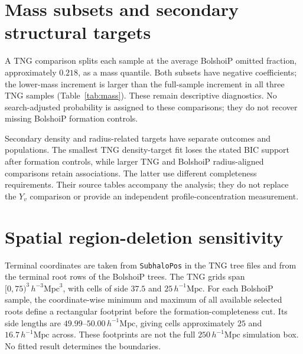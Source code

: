 \documentclass[11pt,a4paper]{article}
\begin{document}
\section{Mass subsets and secondary structural targets}\label{sup:secondary}
A TNG comparison splits each sample at the average BolshoiP omitted fraction, approximately $0.218$, as a mass quantile. Both subsets have negative coefficients; the lower-mass increment is larger than the full-sample increment in all three TNG samples (Table~\ref{tab:mass}). These remain descriptive diagnostics. No search-adjusted probability is assigned to these comparisons; they do not recover missing BolshoiP formation controls.
\begin{table}[htbp]\centering\small

\caption{TNG mass-subset fits with the four epochs. Errors are conventional OLS estimates. These are descriptive comparisons without a search-adjusted inference.}\label{tab:mass}
\end{table}

Secondary density and radius-related targets have separate outcomes and populations. The smallest TNG density-target fit loses the stated BIC support after formation controls, while larger TNG and BolshoiP radius-aligned comparisons retain associations. The latter use different completeness requirements. Their source tables accompany the analysis; they do not replace the $Y_v$ comparison or provide an independent profile-concentration measurement.


\section{Spatial region-deletion sensitivity}\label{supp:spatial}
Terminal coordinates are taken from \texttt{SubhaloPos} in the TNG tree files and from the terminal root rows of the BolshoiP trees. The TNG grids span $[0,75)^3\,h^{-3}\mathrm{Mpc}^3$, with cells of side $37.5$ and $25\,h^{-1}\mathrm{Mpc}$. For each BolshoiP sample, the coordinate-wise minimum and maximum of all available selected roots define a rectangular footprint before the formation-completeness cut. Its side lengths are $49.99$--$50.00\,h^{-1}\mathrm{Mpc}$, giving cells approximately $25$ and $16.7\,h^{-1}\mathrm{Mpc}$ across. These footprints are not the full $250\,h^{-1}\mathrm{Mpc}$ simulation box. No fitted result determines the boundaries.
\end{document}
